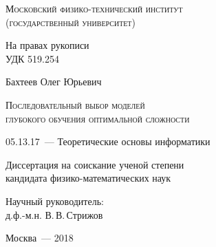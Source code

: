 \thispagestyle{empty}


\begin{titlepage}
\begin{center}
\textsc{Московский физико-технический институт \\ (государственный университет)}\\
\end{center}
\vspace{1.5cm}
\begin{flushright}
{На правах рукописи\\
УДК 519.254}
\end{flushright}
\vspace{1.5cm}
\begin{center}
{Бахтеев Олег Юрьевич}
\par
\vspace{2cm}
\textsc{Последовательный выбор моделей \\глубокого обучения оптимальной сложности}
\par
\vspace{2cm}
{05.13.17~--- Теоретические основы информатики}
\par
\vspace{2cm}
{Диссертация на соискание ученой степени\\
кандидата физико-математических наук}
\end{center}
\vspace{2cm}
\hfill\parbox{8,4cm}{Научный руководитель:
\\д.ф.-м.н. В.\,В.\,Стрижов}
\par
\vspace{3.5cm}
\begin{center}
{Москва~--- 2018}
\end{center}
\end{titlepage}



\newpage{}
